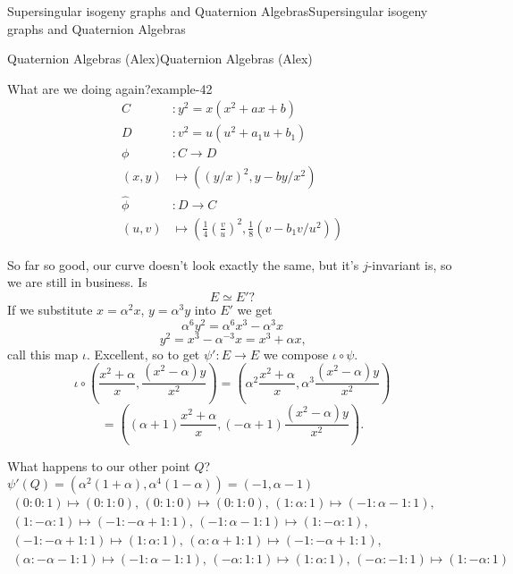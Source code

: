 \documentclass[10pt,]{book}
\numberwithin{equation}{section}
\newcommand{\amp}{&}
\begin{document}
\begin{chapterptx}{Supersingular isogeny graphs and Quaternion Algebras}{}{Supersingular isogeny graphs and Quaternion Algebras}{}{}
\begin{sectionptx}{Quaternion Algebras (Alex)}{}{Quaternion Algebras (Alex)}{}{}
\begin{introduction}{}
\begin{example}{What are we doing again?}{example-42}
\begin{align*}
C\amp\colon y^2 = x(x^2+ax+b)\\
D\amp\colon v^2 = u(u^2+a_1u+b_1)\\
\phi\amp\colon C\to D\\
(x,y) \amp\mapsto ((y/x)^2 , y-by/x^2)\\
\hat\phi\amp\colon D\to C\\
(u,v) \amp\mapsto \left(\frac14\left(\frac vu\right)^2 ,\frac18( v-b_1 v/u^2)\right)
\end{align*}
%
\par
\hypertarget{p-872}{}%
So far so good, our curve doesn't look exactly the same, but it's \(j\)-invariant is, so we are still in business. Is%
\begin{equation*}
E \simeq E'\text{?}
\end{equation*}
If we substitute \(x= \alpha^2 x\), \(y = \alpha ^3 y\) into \(E'\) we get%
\begin{equation*}
\alpha^6 y^2 = \alpha^6 x^3 - \alpha^3 x
\end{equation*}
%
\begin{equation*}
y^2 = x^3 - \alpha^{-3} x = x^3 +\alpha x\text{,}
\end{equation*}
call this map \(\iota\). Excellent, so to get \(\psi' \colon E\to E\) we compose \(\iota\circ \psi\).%
\begin{equation*}
\iota \circ\left( \frac{x^2  + \alpha}{x}, \frac{(x^2 - \alpha )y}{x^2}\right)  = \left( \alpha^2\frac{x^2  + \alpha}{x}, \alpha^3\frac{(x^2 - \alpha )y}{x^2}\right)
\end{equation*}
%
\begin{equation*}
= \left( (\alpha+  1)\frac{x^2  + \alpha}{x}, ( -\alpha  + 1)\frac{(x^2 - \alpha )y}{x^2}\right)\text{.}
\end{equation*}
%
\par
\hypertarget{p-873}{}%
What happens to our other point \(Q\)? \(\psi'(Q) = (\alpha^2(1+\alpha), \alpha^4(1-\alpha)) =(-1, \alpha - 1)\)%
\begin{gather*}
(0 : 0 : 1) \mapsto (0 : 1 : 0),\, (0 : 1 : 0) \mapsto (0 : 1 : 0),\, (1 : \alpha : 1) \mapsto (-1 : \alpha -1 : 1),\\
(1 : -\alpha : 1) \mapsto (-1 : -\alpha + 1 : 1),\, (-1 : \alpha -1 : 1) \mapsto (1 : -\alpha : 1),\\
(-1 : -\alpha + 1 : 1) \mapsto (1 : \alpha : 1),\, (\alpha : \alpha + 1 : 1) \mapsto (-1 : -\alpha + 1 : 1),\\
(\alpha : -\alpha -1 : 1) \mapsto (-1 : \alpha -1 : 1),\, (-\alpha : 1 : 1) \mapsto (1 : \alpha : 1),\, (-\alpha : -1 : 1) \mapsto (1 : -\alpha : 1)

\end{gather*}
\end{example}
\end{introduction}
\end{sectionptx}
\end{chapterptx}
\end{document}
